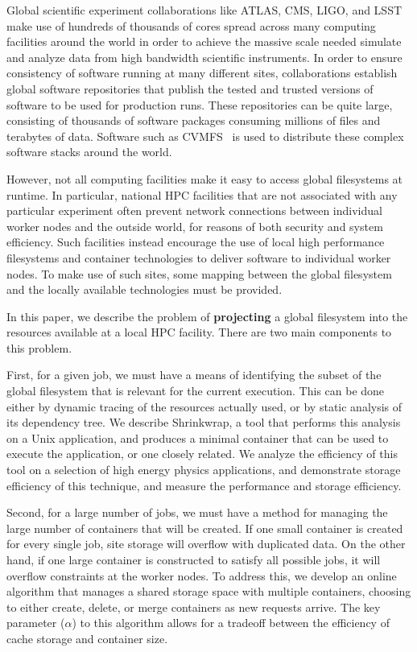 \documentclass[sigconf]{acmart}
\begin{document}
Global scientific experiment collaborations like ATLAS, CMS, LIGO,
and LSST make use of hundreds of thousands of cores spread across
many computing facilities around the world in order to achieve the massive scale needed simulate and analyze data from high bandwidth
scientific instruments.  In order to ensure consistency of software
running at many different sites, collaborations establish global
software repositories that publish the tested and trusted versions
of software to be used for production runs.  These repositories
can be quite large, consisting of thousands of software packages
consuming millions of files and terabytes of data.  Software
such as CVMFS~\cite{globalfs-cise-2015} is used to distribute
these complex software stacks around the world.

However, not all computing facilities make it easy to access global filesystems at runtime.
In particular, national HPC facilities that are not associated with any
particular experiment often prevent network connections between
individual worker nodes and the outside world, for reasons
of both security and system efficiency.  Such facilities instead
encourage the use of local high performance filesystems and container
technologies to deliver software to individual worker nodes.
To make use of such sites, some mapping between the global
filesystem and the locally available technologies must be provided.

In this paper, we describe the problem of {\bf projecting} a global
filesystem into the resources available at a local HPC facility.
There are two main components to this problem.

First, for a given job, we must have a means of identifying the
subset of the global filesystem that is relevant for the current
execution.  This can be done either by dynamic tracing of the resources
actually used, or by static analysis of its dependency tree.
We describe Shrinkwrap, a tool that performs this analysis on
a Unix application, and produces a minimal container
that can be used to execute the application, or one closely related.
We analyze the efficiency of this tool on a selection of high
energy physics applications, and demonstrate storage efficiency of this technique, and measure the performance and storage efficiency.

Second, for a large number of jobs, we must have a method for
managing the large number of containers that will be created.
If one small container is created for every single job,
site storage will overflow with duplicated data.  On the other
hand, if one large container is constructed to satisfy all
possible jobs, it will overflow constraints at the worker nodes.
To address this, we develop an online algorithm that manages
a shared storage space with multiple containers, choosing to
either create, delete, or merge containers as new requests arrive.
The key parameter ($\alpha$) to this algorithm allows for a
tradeoff between the efficiency of cache storage and container size.
\end{document}
